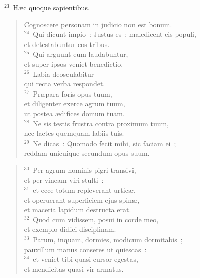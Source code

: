 ${}^{23}$~H\ae c quoque sapientibus. \begin{flushleft}\begin{verse}Cognoscere personam in judicio non est bonum.\\
${}^{24}$~Qui dicunt impio~: Justus es~: maledicent eis populi,\\ et detestabuntur eos tribus.\\
${}^{25}$~Qui arguunt eum laudabuntur,\\ et super ipsos veniet benedictio.\\
${}^{26}$~Labia deosculabitur\\ qui recta verba respondet.\\
${}^{27}$~Pr\ae para foris opus tuum,\\ et diligenter exerce agrum tuum,\\ ut postea \ae difices domum tuam.\\
${}^{28}$~Ne sis testis frustra contra proximum tuum,\\ nec lactes quemquam labiis tuis.\\
${}^{29}$~Ne dicas~: Quomodo fecit mihi, sic faciam ei~;\\ reddam unicuique secundum opus suum.\end{verse}\end{flushleft}


\begin{flushleft}\begin{verse}${}^{30}$~Per agrum hominis pigri transivi,\\ et per vineam viri stulti~:\\
${}^{31}$~et ecce totum repleverant urtic\ae ,\\ et operuerant superficiem ejus spin\ae ,\\ et maceria lapidum destructa erat.\\
${}^{32}$~Quod cum vidissem, posui in corde meo,\\ et exemplo didici disciplinam.\\
${}^{33}$~Parum, inquam, dormies, modicum dormitabis~;\\ pauxillum manus conseres ut quiescas~:\\
${}^{34}$~et veniet tibi quasi cursor egestas,\\ et mendicitas quasi vir armatus.\end{verse}\end{flushleft}


